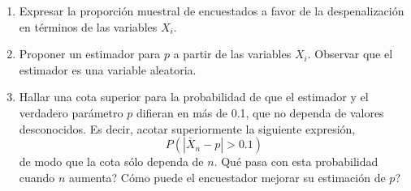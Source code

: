 \documentclass[11pt,a4paper,twoside]{article}%
\begin{document}
\begin{enumerate}
\begin{enumerate}
\item Expresar la proporci\'{o}n muestral de encuestados a favor de la
despenalizaci\'{o}n en t\'{e}rminos de las variables $X_{i}.$

\item Proponer un estimador para $p$ a partir de las variables $X_{i}.$
Observar que el estimador es una variable aleatoria.

\item Hallar una cota superior para la probabilidad de que el estimador y el
verdadero par\'{a}metro $p$ difieran en m\'{a}s de 0.1, que no dependa de
valores desconocidos. Es decir, acotar superiormente la siguiente
expresi\'{o}n,
\[
P\left(  \left\vert \overline{X}_{n}-p\right\vert >0.1\right)
\]
de modo que la cota s\'{o}lo dependa de $n$. \textquestiondown Qu\'{e} pasa
con esta probabilidad cuando $n$ aumenta? \textquestiondown C\'{o}mo puede el
encuestador mejorar su estimaci\'{o}n de $p$?
\end{enumerate}
%
%
%

\end{enumerate}
\end{document}
